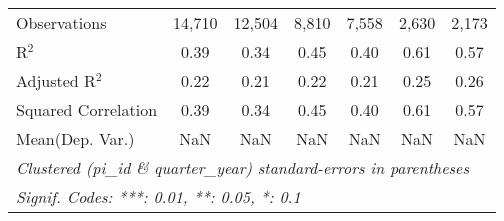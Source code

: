 \begin{tabular}{lcccccc}
   Observations                                               & 14,710      & 12,504      & 8,810   & 7,558   & 2,630       & 2,173\\  
   R$^2$                                                      & 0.39        & 0.34        & 0.45    & 0.40    & 0.61        & 0.57\\  
   Adjusted R$^2$                                             & 0.22        & 0.21        & 0.22    & 0.21    & 0.25        & 0.26\\  
   Squared Correlation                                        & 0.39        & 0.34        & 0.45    & 0.40    & 0.61        & 0.57\\  
Mean(Dep. Var.) & NaN & NaN & NaN & NaN & NaN & NaN \\
   \midrule \midrule
   \multicolumn{7}{l}{\emph{Clustered (pi\_id \& quarter\_year) standard-errors in parentheses}}\\
   \multicolumn{7}{l}{\emph{Signif. Codes: ***: 0.01, **: 0.05, *: 0.1}}\\
\end{tabular}
\par\endgroup
